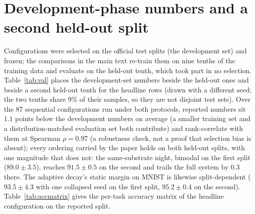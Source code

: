 \documentclass{article}
\begin{document}
\section{Development-phase numbers and a second held-out split}
\label{app:val}

Configurations were selected on the official test splits (the development set) and frozen;
the comparisons in the main text re-train them on nine tenths of the training data and
evaluate on the held-out tenth, which took part in no selection. Table~\ref{tab:val} places
the development-set numbers beside the held-out ones and beside a second held-out tenth for
the headline rows (drawn with a different seed; the two tenths share $9\%$ of their samples,
so they are not disjoint test sets). Over the $87$ sequential configurations run under both protocols, reported
numbers sit $1.1$ points below the development numbers on average (a smaller training set
and a distribution-matched evaluation set both contribute) and rank-correlate with them at Spearman $\rho=0.97$ (a robustness check, not a proof that selection
bias is absent); every ordering carried by the paper holds on both held-out splits, with
one magnitude that does not: the same-substrate night, bimodal on the first split
($89.0\pm3.5$), reaches $91.5\pm0.5$ on the second and trails the full system by $0.3$ there.
The adaptive decay's static margin on MNIST is likewise split-dependent ($93.5\pm4.3$ with one
collapsed seed on the first split, $95.2\pm0.4$ on the second). Table~\ref{tab:accmatrix}
gives the per-task accuracy matrix of the headline configuration on the reported split.
\end{document}
